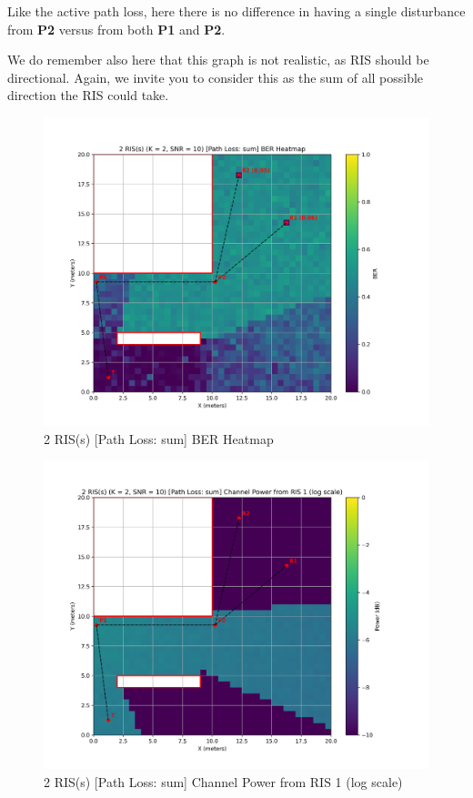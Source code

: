 Like the active path loss, here there is no difference in having a single disturbance from \textbf{P2} versus from both \textbf{P1} and \textbf{P2}.

We do remember also here that this graph is not realistic, as RIS should be directional. Again, we invite you to consider this as the sum of all possible direction the RIS could take.

\begin{figure}[H]
  \centering
  \includegraphics[width=0.7\linewidth]{imgs/heatmap-simulations/2 RIS(s) (K = 2, SNR = 10) [Path Loss_ sum] BER Heatmap.png}
  \caption{2 RIS(s) [Path Loss: sum] BER Heatmap}
\end{figure}

\begin{figure}[H]
  \centering
  \includegraphics[width=0.7\linewidth]{imgs/heatmap-simulations/2 RIS(s) (K = 2, SNR = 10) [Path Loss_ sum] Channel Power from RIS 1 (log scale).png}
  \caption{2 RIS(s) [Path Loss: sum] Channel Power from RIS 1 (log scale)}
\end{figure}

